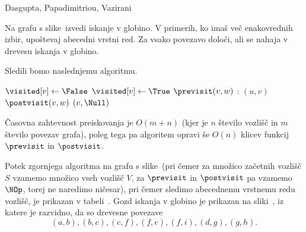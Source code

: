 \begin{naloga}%
{Dasgupta, Papadimitriou, Vazirani}{\cite[Exercise~3.1]{dpv}}
\begin{vprasanje}
Na grafu s slike~\fig[bfs] izvedi iskanje v globino.
V primerih, ko imaš več ena\-ko\-vred\-nih izbir,
upoštevaj abecedni vrstni red.
Za vsako povezavo določi, ali se nahaja v drevesu iskanja v globino.
\end{vprasanje}

\begin{odgovor}
Sledili bomo naslednjemu algoritmu.
\begin{small}
\begin{algorithmic}
        \State $\visited[v] \gets \False$
    \EndFor
    \needspace{\baselineskip}
        \If{$\visited[v]$}
            \State \Return
        \EndIf
        \State $\visited[v] \gets \True$
        \State $\previsit(v, w)$
        :
            $(u, v)$
        \EndFor
        \State $\postvisit(v, w)$
    \EndFunction
        $(v, \Null)$
    \EndFor
\EndFunction
\end{algorithmic}
\end{small}
Časovna zahtevnost preiskovanja je $O(m + n)$
(kjer je $n$ število vozlišč in $m$ število povezav grafa),
poleg tega pa algoritem opravi
še $O(n)$ klicev funkcij $\previsit$ in $\postvisit$.

Potek zgornjega algoritma na grafu s slike~\fig[bfs]
(pri čemer za množico za\-čet\-nih vozlišč $S$
vzamemo množico vseh vozlišč $V$,
za $\previsit$ in $\postvisit$ pa vzamemo $\NOp$,
torej ne naredimo ničesar),
pri čemer sledimo abecednemu vrstnemu redu vozlišč,
je prikazan v tabeli~\tab.
Gozd iskanja v globino je prikazan na sliki~\fig,
iz katere je razvidno, da so drevesne povezave
$$
(a, b), (b, c), (c, f), (f, e), (f, i), (d, g), (g, h).
$$


\end{odgovor}
\end{naloga}
